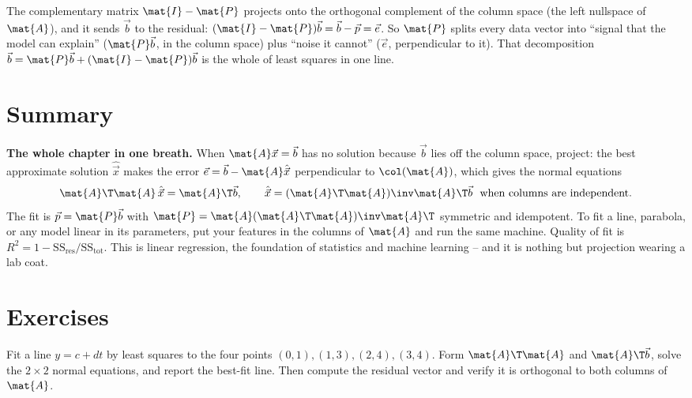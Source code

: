 \begin{remark}
The complementary matrix $\mat{I}-\mat{P}$ projects onto the orthogonal complement of the column
space (the left nullspace of $\mat{A}$), and it sends $\vec{b}$ to the residual:
$(\mat{I}-\mat{P})\vec{b}=\vec{b}-\vec{p}=\vec{e}$. So $\mat{P}$ splits every data vector into
``signal that the model can explain'' ($\mat{P}\vec{b}$, in the column space) plus ``noise it
cannot'' ($\vec{e}$, perpendicular to it). That decomposition $\vec{b}=\mat{P}\vec{b}
+(\mat{I}-\mat{P})\vec{b}$ is the whole of least squares in one line.
\end{remark}

\section{Summary}

\begin{focusbox}
\textbf{The whole chapter in one breath.} When $\mat{A}\vec{x}=\vec{b}$ has no solution because
$\vec{b}$ lies off the column space, project: the best approximate solution $\hat{\vec{x}}$ makes
the error $\vec{e}=\vec{b}-\mat{A}\hat{\vec{x}}$ perpendicular to $\col(\mat{A})$, which gives the
normal equations
\[
  \mat{A}\T\mat{A}\,\hat{\vec{x}}=\mat{A}\T\vec{b},
  \qquad
  \hat{\vec{x}}=(\mat{A}\T\mat{A})\inv\mat{A}\T\vec{b}
  \ \text{ when columns are independent.}
\]
The fit is $\vec{p}=\mat{P}\vec{b}$ with $\mat{P}=\mat{A}(\mat{A}\T\mat{A})\inv\mat{A}\T$
symmetric and idempotent. To fit a line, parabola, or any model linear in its parameters, put your
features in the columns of $\mat{A}$ and run the same machine. Quality of fit is
$R^2=1-\mathrm{SS_{res}}/\mathrm{SS_{tot}}$. This is linear regression, the foundation of
statistics and machine learning -- and it is nothing but projection wearing a lab coat.
\end{focusbox}

\section*{Exercises}

\begin{exercise}\label{ch19:ex-line}
Fit a line $y=c+dt$ by least squares to the four points $(0,1),(1,3),(2,4),(3,4)$. Form
$\mat{A}\T\mat{A}$ and $\mat{A}\T\vec{b}$, solve the $2\times2$ normal equations, and report the
best-fit line. Then compute the residual vector and verify it is orthogonal to both columns of
$\mat{A}$.
\end{exercise}

